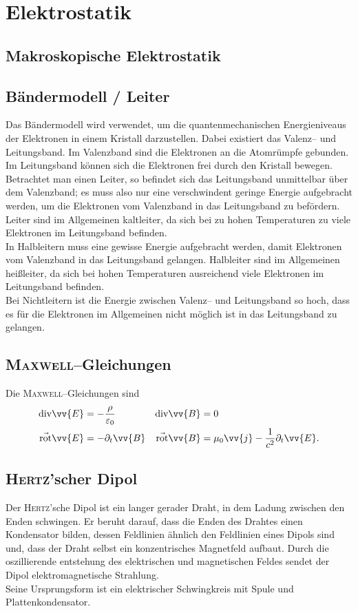 \newpage
\section{Elektrostatik}
\subsection{Makroskopische Elektrostatik}

\subsection{Bändermodell / Leiter}
Das Bändermodell wird verwendet, um die quantenmechanischen Energieniveaus der Elektronen in einem Kristall darzustellen.
Dabei existiert das Valenz-- und Leitungsband. 
Im Valenzband sind die Elektronen an die Atomrümpfe gebunden.
Im Leitungsband können sich die Elektronen frei durch den Kristall bewegen.\\\indent
Betrachtet man einen Leiter, so befindet sich das Leitungsband unmittelbar über dem Valenzband; es muss also nur eine verschwindent geringe Energie aufgebracht werden, um die Elektronen vom Valenzband in das Leitungsband zu befördern. 
Leiter sind im Allgemeinen kaltleiter, da sich bei zu hohen Temperaturen zu viele Elektronen im Leitungsband befinden.\\\indent
In Halbleitern muss eine gewisse Energie aufgebracht werden, damit Elektronen vom Valenzband in das Leitungsband gelangen.
Halbleiter sind im Allgemeinen heißleiter, da sich bei hohen Temperaturen ausreichend viele Elektronen im Leitungsband befinden.\\\indent
Bei Nichtleitern ist die Energie zwischen Valenz-- und Leitungsband so hoch, dass es für die Elektronen im Allgemeinen nicht möglich ist in das Leitungsband zu gelangen.

\subsection{\textsc{Maxwell}--Gleichungen}
Die \textsc{Maxwell}--Gleichungen sind
\begin{align} 
        \text{div}\vv{E}&=-\dfrac{\rho }{\varepsilon _0}&\text{div}\vv{B}&=0\\
        \vec{\text{rot}}\vv{E}&=-\partial_t \vv{B}&\vec{\text{rot}}\vv{B}&=\mu _0\vv{j}-\dfrac{1}{c^2}\partial_t \vv{E}
.\end{align} 

\subsection{\textsc{Hertz}'scher Dipol}
Der \textsc{Hertz}'sche Dipol ist ein langer gerader Draht, in dem Ladung zwischen den Enden schwingen.
Er beruht darauf, dass die Enden des Drahtes einen Kondensator bilden, dessen Feldlinien ähnlich den Feldlinien eines Dipols sind und, dass der Draht selbst ein konzentrisches Magnetfeld aufbaut.
Durch die oszillierende entstehung des elektrischen und magnetischen Feldes sendet der Dipol elektromagnetische Strahlung.\\\indent
Seine Ursprungsform ist ein elektrischer Schwingkreis mit Spule und Plattenkondensator.

